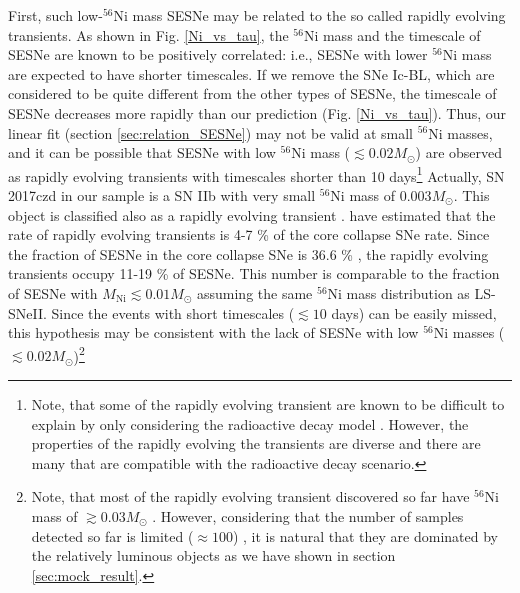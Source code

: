 \documentclass[twocolumn, linenumbers]{aastex62}
\begin{document}
First, such low-$^{56}$Ni mass SESNe may be related to the so called rapidly evolving transients. As shown in Fig. \ref{Ni_vs_tau}, the $^{56}$Ni mass and the timescale of SESNe are known to be positively correlated: i.e., SESNe with lower $^{56}$Ni mass are expected to have shorter timescales. If we remove the SNe Ic-BL, which are considered to be quite different from the other types of SESNe, the timescale of SESNe decreases more rapidly than our prediction (Fig. \ref{Ni_vs_tau}).
Thus, our linear fit (section \ref{sec:relation_SESNe}) may not be valid at small $^{56}$Ni masses, and it can be possible that SESNe with low $^{56}$Ni mass ($\lesssim 0.02M_{\odot}$) are observed as rapidly evolving transients with timescales shorter than 10 days\footnote{Note, that some of the rapidly evolving transient are known to be difficult to explain by only considering the radioactive decay model \citep[e.g.][]{2014ApJ...794...23D}. However, the properties of the rapidly evolving the transients are diverse \citep{ 2018MNRAS.481..894P} and there are many that are compatible with the radioactive decay scenario.}
Actually, SN 2017czd in our sample is a SN IIb with very small $^{56}$Ni mass of $0.003M_{\odot}$. This object is classified also 
as a rapidly evolving transient \citep{2019ApJ...875...76N}. \citet{2014ApJ...794...23D} have estimated that the rate of rapidly evolving transients is 4-7 \% of the core collapse SNe rate. Since the fraction of SESNe in the core collapse SNe is 36.6 \% \citep{2011MNRAS.412.1522S}, the rapidly evolving transients occupy 11-19 \% of SESNe. This number is comparable to the fraction of SESNe with $M_{\mathrm{Ni}} \lesssim 0.01 M_{\odot}$ assuming the same $^{56}$Ni mass distribution as LS-SNeII. Since the events with short timescales ($\lesssim 10$ days) can be easily missed, this hypothesis may be consistent with the lack of SESNe with low $^{56}$Ni masses ($\lesssim 0.02 M_{\odot}$)\footnote{Note, that most of the rapidly evolving transient discovered so far have $^{56}$Ni mass of $\gtrsim 0.03 M_{\odot}$ \citep{2014ApJ...794...23D, 2018MNRAS.481..894P, 2020ApJ...894...27T}. However, considering that the number of samples detected so far is limited ($\approx 100$) \citep{2018MNRAS.481..894P}, it is natural that they are dominated by the relatively luminous objects as we have shown in section \ref{sec:mock_result}.}


\end{document}
